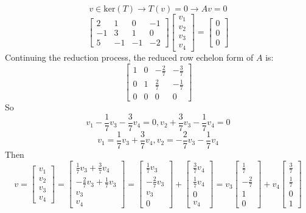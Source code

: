 \documentclass[12pt]{article}
\begin{document}
\begin{example}
$$ v\in \mathrm{ker}(T) \rightarrow T(v) = 0 \rightarrow Av = 0 $$ $$\left[\begin{array}{cccc}2 & 1 & 0 & -1 \\-1 & 3 & 1 & 0 \\5 & -1 & -1 & -2\end{array}\right]\left[\begin{array}{c}v_1 \\v_2 \\v_3 \\v_4 \end{array}\right] = \left[\begin{array}{c} 0 \\ 0 \\ 0 \end{array}\right] $$ Continuing the reduction process, the reduced row echelon form of $A$ is: $$\left[\begin{array}{cccc}1 & 0 & -\frac{2}{7} & -\frac{3}{7} \\0 & 1 & \frac{2}{7} & -\frac{1}{7} \\0 & 0 & 0 & 0\end{array}\right] $$ So $$v_1 - \frac{1}{7}v_3 - \frac{3}{7}v_4 = 0, v_2 + \frac{3}{7}v_3 - \frac{1}{7}v_4 = 0$$ $$v_1 = \frac{1}{7}v_3 + \frac{3}{7}v_4, v_2 = -\frac{2}{7}v_3 - \frac{1}{7}v_4 $$ Then $$v = \begin{bmatrix} v_1 \\ v_2 \\ v_3 \\ v_4 \end{bmatrix} = \begin{bmatrix} \frac{1}{7}v_3 + \frac{3}{7}v_4 \\ -\frac{2}{7}v_3 + \frac{1}{7}v_3 \\ v_3 \\ v_4 \end{bmatrix} = \begin{bmatrix} \frac{1}{7}v_3 \\ -\frac{2}{7}v_3 \\ v_3 \\ 0 \end{bmatrix} + \begin{bmatrix} \frac{3}{7}v_4 \\ \frac{1}{7}v_4 \\ 0 \\ v_4 \end{bmatrix} = v_3\begin{bmatrix} \frac{1}{7} \\ -\frac{2}{7} \\ 1 \\ 0 \end{bmatrix} + v_4\begin{bmatrix} \frac{3}{7} \\ \frac{1}{7} \\ 0 \\ 1 \end{bmatrix} $$ 
\end{example}
\end{document}
